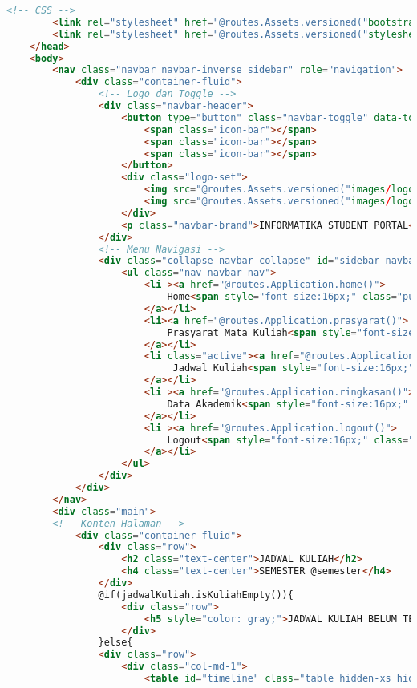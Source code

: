 \begin{lstlisting}[language=html,basicstyle=\tiny,caption=jadwalKuliah.scala.html]
		<!-- CSS -->
        <link rel="stylesheet" href="@routes.Assets.versioned("bootstrap/css/bootstrap.min.css")">
        <link rel="stylesheet" href="@routes.Assets.versioned("stylesheets/main.css")"> 
    </head>
    <body>
		<nav class="navbar navbar-inverse sidebar" role="navigation">
			<div class="container-fluid">
				<!-- Logo dan Toggle -->
				<div class="navbar-header">
					<button type="button" class="navbar-toggle" data-toggle="collapse" data-target="#sidebar-navbar-collapse">
						<span class="icon-bar"></span>
						<span class="icon-bar"></span>
						<span class="icon-bar"></span>
					</button>
					<div class="logo-set">
						<img src="@routes.Assets.versioned("images/logo-unpar.png")" width="25%" height="25%"/>
						<img src="@routes.Assets.versioned("images/logo-IT.png")" width="25%" height="25%"/>
					</div>
					<p class="navbar-brand">INFORMATIKA STUDENT PORTAL</p>
				</div>
				<!-- Menu Navigasi -->
				<div class="collapse navbar-collapse" id="sidebar-navbar-collapse">
					<ul class="nav navbar-nav">
						<li ><a href="@routes.Application.home()">
							Home<span style="font-size:16px;" class="pull-right hidden-xs showopacity glyphicon glyphicon-home"></span>
						</a></li>
						<li><a href="@routes.Application.prasyarat()">
							Prasyarat Mata Kuliah<span style="font-size:16px;" class="pull-right hidden-xs showopacity glyphicon glyphicon-tasks"></span>
						</a></li>
						<li class="active"><a href="@routes.Application.jadwalKuliah()">
							 Jadwal Kuliah<span style="font-size:16px;" class="pull-right hidden-xs showopacity glyphicon glyphicon-calendar"></span>
						</a></li>
						<li ><a href="@routes.Application.ringkasan()">
							Data Akademik<span style="font-size:16px;" class="pull-right hidden-xs showopacity glyphicon glyphicon-book"></span>
						</a></li>
						<li ><a href="@routes.Application.logout()">
							Logout<span style="font-size:16px;" class="pull-right hidden-xs showopacity glyphicon glyphicon-log-out"></span>
						</a></li>
					</ul>
				</div>
			</div>
		</nav>
		<div class="main">
		<!-- Konten Halaman -->
			<div class="container-fluid">
				<div class="row">
					<h2 class="text-center">JADWAL KULIAH</h2> 
					<h4 class="text-center">SEMESTER @semester</h4>
				</div>
				@if(jadwalKuliah.isKuliahEmpty()){
					<div class="row">
						<h5 style="color: gray;">JADWAL KULIAH BELUM TERSEDIA <span class="glyphicon glyphicon-exclamation-sign"></span></h5>
					</div>	
				}else{
				<div class="row">
					<div class="col-md-1">
						<table id="timeline" class="table hidden-xs hidden-sm">

\end{lstlisting}
